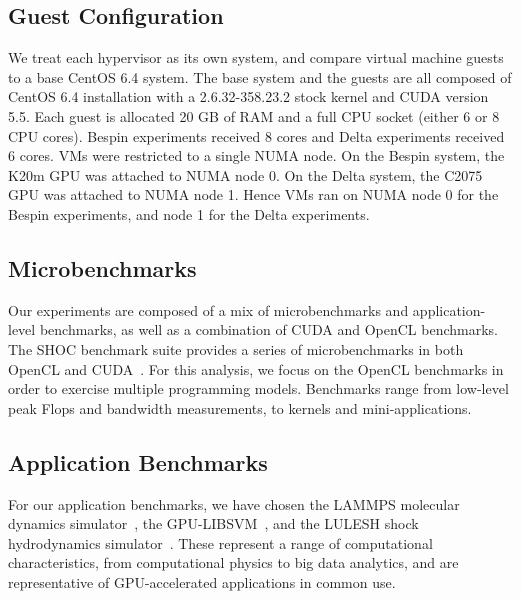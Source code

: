 


\subsection{Guest Configuration}\label{GUESTS}

We treat each hypervisor as its own system, and compare virtual machine guests
to a base CentOS 6.4 system. The base system and the guests are all composed of
CentOS 6.4 installation with a 2.6.32-358.23.2 stock
kernel and CUDA version 5.5. Each guest is allocated 20 GB of RAM and a full CPU
socket (either 6 or 8 CPU cores).  Bespin experiments received 8 cores and Delta
experiments received 6 cores.  VMs were restricted to a single NUMA node.  On
the Bespin system, the K20m GPU was attached to NUMA node 0.  On the Delta
system, the C2075 GPU was attached to NUMA node 1.  Hence VMs ran on NUMA node 0
for the Bespin experiments, and node 1 for the Delta experiments. 



\subsection{Microbenchmarks}

Our experiments are composed of a mix of microbenchmarks and application-level
benchmarks, as well as a combination of CUDA and OpenCL benchmarks.  The SHOC
benchmark suite provides a series of microbenchmarks in both OpenCL and
CUDA~\cite{Danalis:2010}. For this analysis, we focus on the OpenCL benchmarks
in order to exercise multiple programming models.  Benchmarks range from
low-level peak Flops and bandwidth measurements, to kernels and
mini-applications.  


\subsection{Application Benchmarks}
For our application benchmarks, we have chosen the LAMMPS molecular
dynamics simulator~\cite{LAMMPS}, the GPU-LIBSVM~\cite{Athanasopoulos:2011}, and the
LULESH shock hydrodynamics simulator~\cite{LULESH}.  These represent a range of
computational characteristics, from computational physics to big data analytics, and are
representative of GPU-accelerated applications in common use. 

